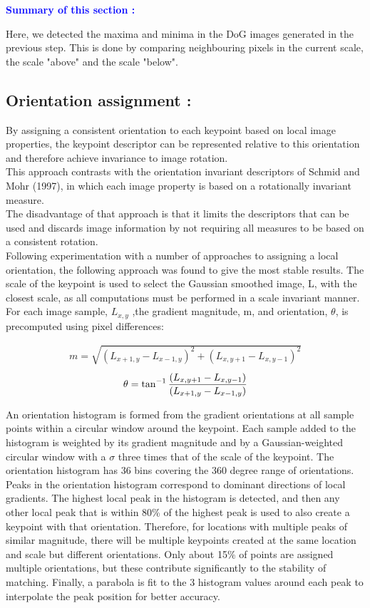 \textcolor{blue}{\textbf{Summary of this section :} }

Here, we detected the maxima and minima in the DoG images generated in the previous step. This is done by comparing neighbouring pixels in the current scale, the scale "above" and the scale "below".


\subsection{Orientation assignment :}
By assigning a consistent orientation to each keypoint based on local image properties,
the keypoint descriptor can be represented relative to this orientation and therefore achieve
invariance to image rotation.\\ This approach contrasts with the orientation invariant descriptors
of Schmid and Mohr (1997), in which each image property is based on a rotationally
invariant measure.\\ The disadvantage of that approach is that it limits the descriptors that
can be used and discards image information by not requiring all measures to be based on a
consistent rotation.\\

Following experimentation with a number of approaches to assigning a local orientation,
the following approach was found to give the most stable results. The scale of the
keypoint is used to select the Gaussian smoothed image, L, with the closest scale, as all
computations must be performed in a scale invariant manner. For each image sample, $L_{x,y}$ ,the gradient magnitude, m, and orientation, $\theta$, is precomputed using pixel differences:

\begin{align}
 m  =\sqrt{(L_{x+1,y} - L_{x-1,y})^2 + (L_{x,y+1} - L_{x,y-1})^2}
\end{align}
\begin{align}
  \theta = \tan^{\small{-1}}\frac{(L_{x,y+1} - L_{x,y-1})}{(L_{x+1,y} - L_{x-1,y})}
\end{align}

An orientation histogram is formed from the gradient orientations at all sample points
within a circular window around the keypoint. Each sample added to the histogram is
weighted by its gradient magnitude and by a Gaussian-weighted circular window with a $\sigma$
three times that of the scale of the keypoint. The orientation histogram has 36 bins covering
the 360 degree range of orientations.
Peaks in the orientation histogram correspond to dominant directions of local gradients.
The highest local peak in the histogram is detected, and then any other local peak that is
within 80\% of the highest peak is used to also create a keypoint with that orientation.
Therefore, for locations with multiple peaks of similar magnitude, there will be multiple
keypoints created at the same location and scale but different orientations. Only about
15\% of points are assigned multiple orientations, but these contribute significantly to the
stability of matching. Finally, a parabola is fit to the 3 histogram values around each peak
to interpolate the peak position for better accuracy.


